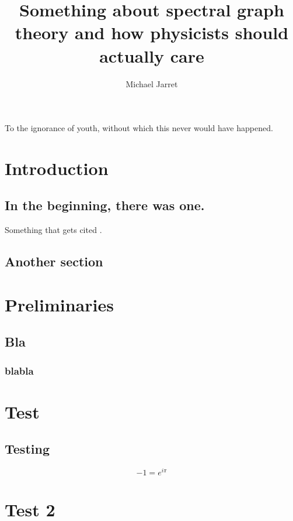 \documentclass[letterpaper,12pt]{umd-thesis}  %
\title{Something about spectral graph theory and how physicists should actually care} %
\author{Michael Jarret} %
\begin{document}
\begin{abstract}
    \lipsum[1]
    \lipsum[2]
    \lipsum[3]
\end{abstract} 

\begin{preliminary}

	\begin{preface}
		\lipsum[4]
	\end{preface}
	
	\begin{foreword}
		\lipsum[5]
	\end{foreword}

	\begin{dedication}
		To the ignorance of youth, without which this never would have happened.
	\end{dedication}

	\begin{acknowledgements}
		\lipsum[6]
	\end{acknowledgements}
\end{preliminary}

\chapter{Introduction}
	\section{In the beginning, there was one.}
	\lipsum[7] 
	
	Something that gets cited \cite{Ashbaugh1990}.
	\section{Another section}
	\lipsum[8]
	
\chapter{Preliminaries}
	\lipsum[9]
	\section{Bla}
	\lipsum[10]
	\subsection{blabla}
	\lipsum[11]

\appendix
\chapter{Test}
	\section{Testing}
	 \lipsum[5]
	 	\begin{equation}
	 		-1 = e^{i \pi}
	 	\end{equation}
	 	
	 \lipsum[10]
\chapter{Test 2}
	\lipsum[1]


\end{document}
